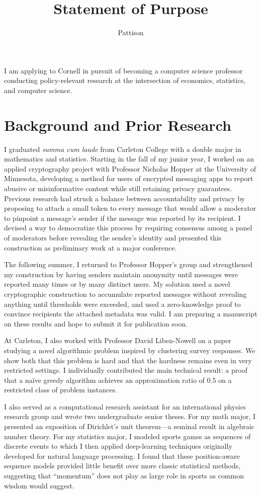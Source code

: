\documentclass{grad-statement}
\author{Pattison}
\title{Statement of Purpose}
\begin{document}
\noindent
I am applying to Cornell in pursuit of becoming a computer science professor conducting policy-relevant research at the intersection of economics, statistics, and computer science.

\section{Background and Prior Research}

I graduated \emph{summa cum laude} from Carleton College with a double major in mathematics and statistics.
Starting in the fall of my junior year, I worked on an applied cryptography project with Professor Nicholas Hopper at the University of Minnesota, developing a method for users of encrypted messaging apps to report abusive or misinformative content while still retaining privacy guarantees.
Previous research had struck a balance between accountability and privacy by proposing to attach a small token to every message that would allow a moderator to pinpoint a message's sender if the message was reported by its recipient.
I devised a way to democratize this process by requiring consensus among a panel of moderators before revealing the sender's identity and presented this construction as preliminary work at a major conference.

The following summer, I returned to Professor Hopper's group and strengthened my construction by having senders maintain anonymity until messages were reported many times or by many distinct users.
My solution used a novel cryptographic construction to accumulate reported messages without revealing anything until thresholds were exceeded, and used a zero-knowledge proof to convince recipients the attached metadata was valid.
I am preparing a manuscript on these results and hope to submit it for publication soon.

At Carleton, I also worked with Professor David Liben-Nowell on a paper studying a novel algorithmic problem inspired by clustering survey responses.
We show both that this problem is hard and that the hardness remains even in very restricted settings.
I individually contributed the main technical result: a proof that a naïve greedy algorithm achieves an approximation ratio of $0.5$ on a restricted class of problem instances.

I also served as a computational research assistant for an international physics research group and wrote two undergraduate senior theses.
For my math major, I presented an exposition of Dirichlet's unit theorem---a seminal result in algebraic number theory.
For my statistics major, I modeled sports games as sequences of discrete events to which I then applied deep-learning techniques originally developed for natural language processing.
I found that these position-aware sequence models provided little benefit over more classic statistical methods, suggesting that ``momentum'' does not play as large role in sports as common wisdom would suggest.
\end{document}
